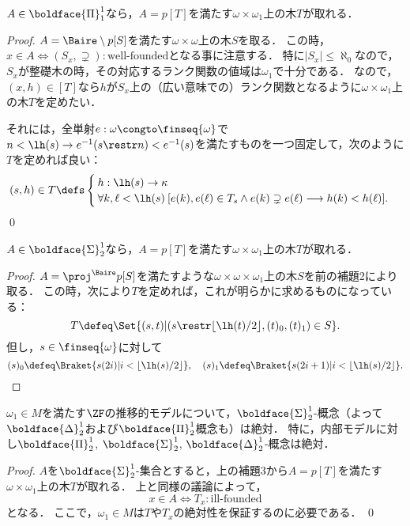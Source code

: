 \documentclass[xelatex,a4j,jadriver=standard]{bxjsarticle}
\begin{document}
\begin{lemma}
 $A \in \boldface{\Pi}^1_1$なら，$A = p[T]$を満たす$\omega \times \omega_1$上の木$T$が取れる．
\end{lemma}
\begin{proof}
 $A = \Baire \setminus p[S]$を満たす$\omega \times \omega$上の木$S$を取る．
 この時，$x \in A \iff (S_x, \supsetneq): \text{well-founded}$となる事に注意する．
 特に$|S_x| \leq \aleph_0$なので，$S_x$が整礎木の時，その対応するランク関数の値域は$\omega_1$で十分である．
 なので，$(x, h) \in [T]$なら$h$が$S_x$上の（広い意味での）ランク関数となるように$\omega \times \omega_1$上の木$T$を定めたい．

 それには，全単射$e: \omega \congto \finseq{\omega}$で$n < \lh(s) \rightarrow e^{-1}(s \restr n) < e^{-1}(s)$を満たすものを一つ固定して，次のように$T$を定めれば良い：
 \[
  (s, h) \in T \defs \begin{cases}
                     h: \lh(s) \to \kappa\\
                     \forall k, \ell < \lh(s)\:[e(k), e(\ell) \in T_s\wedge e(k) \supsetneq e(\ell) \longrightarrow h(k) < h(\ell)].
                    \end{cases}
 \]
 \qed
\end{proof}

\begin{lemma}
 $A \in \boldface{\Sigma}^1_2$なら，$A = p[T]$を満たす$\omega \times \omega_1$上の木$T$が取れる．
\end{lemma}
\begin{proof}
 $A = \proj^{\Baire} p[S]$を満たすような$\omega \times \omega \times \omega_1$上の木$S$を前の補題2により取る．
 この時，次により$T$を定めれば，これが明らかに求めるものになっている：
 \[
  T \defeq \Set{(s, t) | (s \restr \lfloor \lh(t)/2 \rfloor, (t)_0, (t)_1) \in S}.
 \]
 但し，$s \in \finseq{\omega}$に対して
 \[
  (s)_0 \defeq \Braket{s(2i)   | i < \lfloor \lh(s)/2 \rfloor},\quad 
  (s)_1 \defeq \Braket{s(2i+1) | i < \lfloor \lh(s)/2 \rfloor}.
 \]
\end{proof}

\begin{theorem}
 $\omega_1 \in M$を満たす$\ZF$の推移的モデルについて，$\boldface{\Sigma}^1_2$-概念（よって$\boldface{\Delta}^1_2$および$\boldface{\Pi}^1_2$概念も）は絶対．
 特に，内部モデルに対し$\boldface{\Pi}^1_2$, $\boldface{\Sigma}^1_2$, $\boldface{\Delta}^1_2$-概念は絶対．
\end{theorem}
\begin{proof}
 $A$を$\boldface{\Sigma}^1_2$-集合とすると，上の補題3から$A = p[T]$を満たす$\omega \times \omega_1$上の木$T$が取れる．
 上と同様の議論によって，
 \[
  x \in A \iff T_x: \text{ill-founded}
 \]
 となる．
 ここで，$\omega_1 \in M$は$T$や$T_x$の絶対性を保証するのに必要である．
 \qed
\end{proof}

\nocite{Kunen:2011,Jech:2002,Arai:2011,Kunen:2009}
\printbibliography[title=参考文献]
\end{document}
